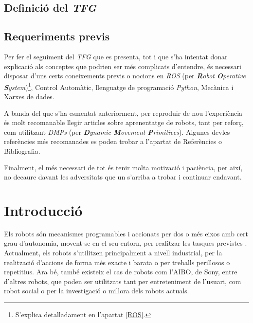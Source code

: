 \documentclass[12pt,a4paper,final,twoside]{article}
\begin{document}
\subsection*{Definició del \textit{TFG}}
\label{Definicio-del-TFG}



\subsection*{Requeriments previs}
\label{Requeriments}

Per fer el seguiment del \textit{TFG} que es presenta, tot i que s'ha intentat donar explicació als conceptes que podrien ser més complicats d'entendre, és necessari disposar d'uns certs coneixements previs o nocions en \textit{ROS} (per \textit{\textbf{R}obot \textbf{O}perative \textbf{S}ystem})\footnote{S'explica detalladament en l'apartat \ref{ROS}.}, Control Automàtic, llenguatge de programació \textit{Python}, Mecànica i Xarxes de dades.

A banda del que s'ha esmentat anteriorment, per reproduir de nou l'experiència és molt recomanable llegir articles sobre aprenentatge de robots, tant per reforç, com utilitzant \textit{DMPs} (per \textit{\textbf{D}ynamic \textbf{M}ovement \textbf{P}rimitives}). Algunes devles referències més recomanades es poden trobar a l'apartat de Referències o Bibliografia.

Finalment, el més necessari de tot és tenir molta motivació i paciència, per així, no decaure davant les adversitats que un s'arriba a trobar i continuar endavant.

\newpage

\section{Introducció}
\label{Introduccio}

Els robots són mecanismes programables i accionats per dos o més eixos amb cert grau d'autonomia, movent-se en el seu entorn, per realitzar les tasques previstes \cite{ISO_Robot}. Actualment, els robots s'utilitzen principalment a nivell industrial, per la realització d'accions de forma més exacte i barata o per treballs perillosos o repetitius. Ara bé, també existeix el cas de robots com l'AIBO, de Sony, entre d'altres robots, que poden ser utilitzats tant per entreteniment de l'usuari, com robot social o per la investigació o millora dels robots actuals.
\end{document}
